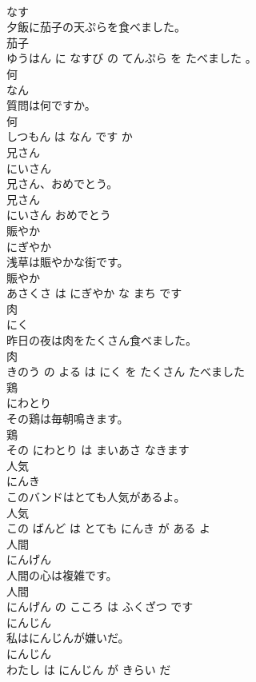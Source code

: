 \documentclass[8pt]{extreport}
\begin{document}
\begin{CJK}{UTF8}{min}
\\	なす			
\\	夕飯に茄子の天ぷらを食べました。	
\\	茄子 
\\	ゆうはん に なすび の てんぷら を たべました 。			
\\	何	
\\	なん			
\\	質問は何ですか。	
\\	何 
\\	しつもん は なん です か			
\\	兄さん	
\\	にいさん			
\\	兄さん、おめでとう。	
\\	兄さん 
\\	にいさん おめでとう			
\\	賑やか	
\\	にぎやか			
\\	浅草は賑やかな街です。	
\\	賑やか 
\\	あさくさ は にぎやか な まち です			
\\	肉	
\\	にく			
\\	昨日の夜は肉をたくさん食べました。	
\\	肉 
\\	きのう の よる は にく を たくさん たべました			
\\	鶏	
\\	にわとり			
\\	その鶏は毎朝鳴きます。	
\\	鶏 
\\	その にわとり は まいあさ なきます			
\\	人気	
\\	にんき			
\\	このバンドはとても人気があるよ。	
\\	人気 
\\	この ばんど は とても にんき が ある よ			
\\	人間	
\\	にんげん			
\\	人間の心は複雑です。	
\\	人間 
\\	にんげん の こころ は ふくざつ です			
\\	にんじん	
\\	私はにんじんが嫌いだ。	
\\	にんじん 
\\	わたし は にんじん が きらい だ			

\end{CJK}
\end{document}
